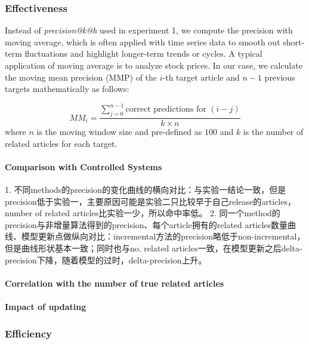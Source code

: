 \subsubsection{Effectiveness}

Instead of \textit{precision@k@h} used in experiment 1, we compute the precision with moving average, which is often applied with time series data to smooth out short-term fluctuations and highlight longer-term trends or cycles. A typical application of moving average is to analyze stock prices. In our case, we calculate the moving mean precision (MMP) of the $i$-th target article and $n-1$ previous targets mathematically as follows:

\begin{equation}
    MM_{i} = \frac{\sum^{n-1}_{j=0} \text{correct predictions for }(i-j)}{k\times n}
\end{equation}
where $n$ is the moving window size and pre-defined as $100$ and $k$ is the number of related articles for each target. 

\paragraph{Comparison with Controlled Systems}



1. 不同methods的precision的变化曲线的横向对比：与实验一结论一致，但是precision低于实验一，主要原因可能是实验二只比较早于自己release的articles，number of related articles比实验一少，所以命中率低。
2. 同一个method的precision与非增量算法得到的precision、每个article拥有的related articles数量曲线、模型更新点做纵向对比：incremental方法的precision略低于non-incremental，但是曲线形状基本一致；同时也与no. related articles一致，在模型更新之后delta-precision下降，随着模型的过时，delta-precision上升。

\paragraph{Correlation with the number of true related articles}

\paragraph{Impact of updating}


\subsubsection{Efficiency}

